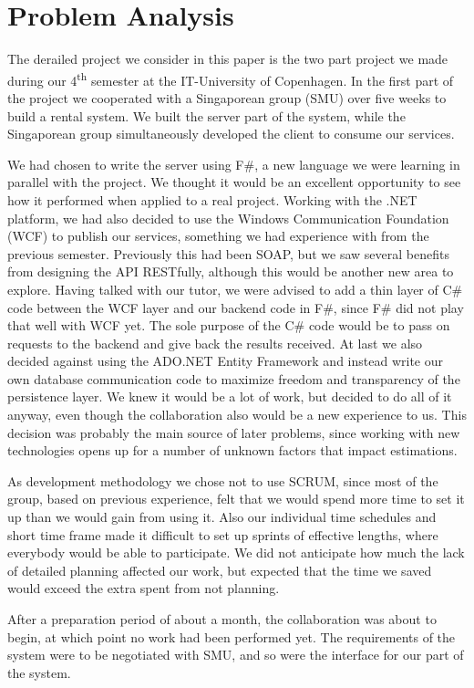 \section{Problem Analysis}
The derailed project we consider in this paper is the two part project we made during our 4\textsuperscript{th} semester at the IT-University of Copenhagen.
In the first part of the project we cooperated with a Singaporean group (SMU) over five weeks to build a rental system. We built the server part of the system, while the Singaporean group simultaneously developed the client to consume our services.

We had chosen to write the server using F\#, a new language we were learning in parallel with the project. We thought it would be an excellent opportunity to see how it performed when applied to a real project.
Working with the .NET platform, we had also decided to use the Windows Communication Foundation (WCF) to publish our services, something we had experience with from the previous semester. Previously this had been SOAP, but we saw several benefits from designing the API RESTfully, although this would be another new area to explore.
Having talked with our tutor, we were advised to add a thin layer of C\# code between the WCF layer and our backend code in F\#, since F\# did not play that well with WCF yet. The sole purpose of the C\# code would be to pass on requests to the backend and give back the results received.
At last we also decided against using the ADO.NET Entity Framework and instead write our own database communication code to maximize freedom and transparency of the persistence layer.
We knew it would be a lot of work, but decided to do all of it anyway, even though the collaboration also would be a new experience to us. This decision was probably the main source of later problems, since working with new technologies opens up for a number of unknown factors that impact estimations.


As development methodology we chose not to use SCRUM, since most of the group, based on previous experience, felt that we would spend more time to set it up than we would gain from using it. Also our individual time schedules and short time frame made it difficult to set up sprints of effective lengths, where everybody would be able to participate. We did not anticipate how much the lack of detailed planning affected our work, but expected that the time we saved would exceed the extra spent from not planning.

After a preparation period of about a month, the collaboration was about to begin, at which point no work had been performed yet. The requirements of the system were to be negotiated with SMU, and so were the interface for our part of the system.

